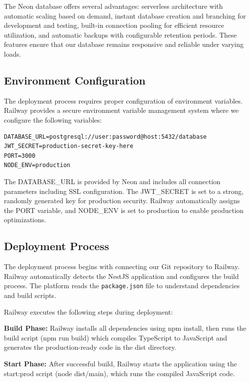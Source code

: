 The Neon database offers several advantages: serverless architecture with automatic scaling based on demand, instant database creation and branching for development and testing, built-in connection pooling for efficient resource utilization, and automatic backups with configurable retention periods. These features ensure that our database remains responsive and reliable under varying loads.

\subsection{Environment Configuration}

The deployment process requires proper configuration of environment variables. Railway provides a secure environment variable management system where we configure the following variables:

\begin{verbatim}
DATABASE_URL=postgresql://user:password@host:5432/database
JWT_SECRET=production-secret-key-here
PORT=3000
NODE_ENV=production
\end{verbatim}

The DATABASE\_URL is provided by Neon and includes all connection parameters including SSL configuration. The JWT\_SECRET is set to a strong, randomly generated key for production security. Railway automatically assigns the PORT variable, and NODE\_ENV is set to production to enable production optimizations.

\subsection{Deployment Process}

The deployment process begins with connecting our Git repository to Railway. Railway automatically detects the NestJS application and configures the build process. The platform reads the \texttt{package.json} file to understand dependencies and build scripts.

Railway executes the following steps during deployment:

\textbf{Build Phase:} Railway installs all dependencies using npm install, then runs the build script (npm run build) which compiles TypeScript to JavaScript and generates the production-ready code in the dist directory.

\textbf{Start Phase:} After successful build, Railway starts the application using the start:prod script (node dist/main), which runs the compiled JavaScript code.

